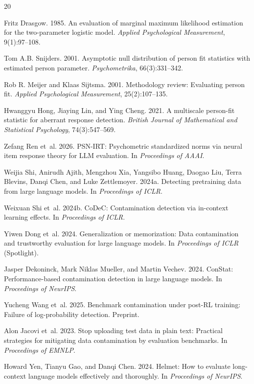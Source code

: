 \documentclass[11pt,a4paper]{article}
\begin{document}
\begin{thebibliography}{20}

Fritz Drasgow.
1985.
An evaluation of marginal maximum likelihood estimation for the two-parameter logistic model.
{\em Applied Psychological Measurement}, 9(1):97--108.

Tom A.B. Snijders.
2001.
Asymptotic null distribution of person fit statistics with estimated person parameter.
{\em Psychometrika}, 66(3):331--342.

Rob R. Meijer and Klaas Sijtsma.
2001.
Methodology review: Evaluating person fit.
{\em Applied Psychological Measurement}, 25(2):107--135.

Hwanggyu Hong, Jiaying Lin, and Ying Cheng.
2021.
A multiscale person-fit statistic for aberrant response detection.
{\em British Journal of Mathematical and Statistical Psychology}, 74(3):547--569.

Zefang Ren et~al.
2026.
PSN-IRT: Psychometric standardized norms via neural item response theory for LLM evaluation.
In {\em Proceedings of AAAI}.

Weijia Shi, Anirudh Ajith, Mengzhou Xia, Yangsibo Huang, Daogao Liu, Terra Blevins, Danqi Chen, and Luke Zettlemoyer.
2024a.
Detecting pretraining data from large language models.
In {\em Proceedings of ICLR}.

Weixuan Shi et~al.
2024b.
CoDeC: Contamination detection via in-context learning effects.
In {\em Proceedings of ICLR}.

Yiwen Dong et~al.
2024.
Generalization or memorization: Data contamination and trustworthy evaluation for large language models.
In {\em Proceedings of ICLR} (Spotlight).

Jasper Dekoninck, Mark Niklas Mueller, and Martin Vechev.
2024.
ConStat: Performance-based contamination detection in large language models.
In {\em Proceedings of NeurIPS}.

Yucheng Wang et~al.
2025.
Benchmark contamination under post-RL training: Failure of log-probability detection.
Preprint.

Alon Jacovi et~al.
2023.
Stop uploading test data in plain text: Practical strategies for mitigating data contamination by evaluation benchmarks.
In {\em Proceedings of EMNLP}.

Howard Yen, Tianyu Gao, and Danqi Chen.
2024.
Helmet: How to evaluate long-context language models effectively and thoroughly.
In {\em Proceedings of NeurIPS}.

\end{thebibliography}
\end{document}
